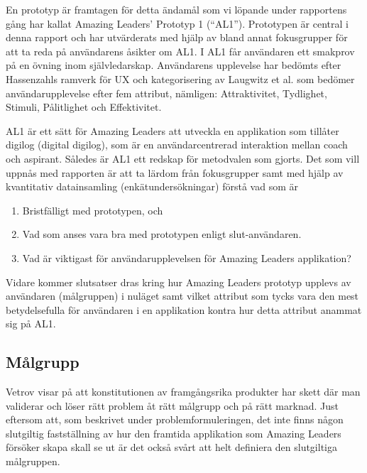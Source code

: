 En prototyp är framtagen för detta ändamål som vi löpande under rapportens gång har kallat Amazing Leaders' Prototyp 1 (\enquote{AL1}). Prototypen är central i denna rapport och har utvärderats med hjälp av bland annat fokusgrupper för att ta reda på användarens åsikter om  AL1. I AL1 får användaren ett smakprov på en övning inom självledarskap. Användarens upplevelse har bedömts efter Hassenzahls ramverk för UX \cite{Hassenzahl2001TheAppealingness} och kategorisering av Laugwitz et al. \cite{Laugwitz2008ConstructionQuestionnaire} som bedömer användarupplevelse efter fem attribut, nämligen: Attraktivitet, Tydlighet, Stimuli, Pålitlighet och Effektivitet. 
\newline


AL1 är ett sätt för Amazing Leaders att utveckla en applikation som tillåter digilog (digital digilog), som är en användarcentrerad interaktion mellan coach och aspirant. Således är AL1 ett redskap för metodvalen som gjorts. Det som vill uppnås med rapporten är att ta lärdom från fokusgrupper samt med hjälp av kvantitativ datainsamling (enkätundersökningar) förstå vad som är 

\begin{enumerate}
\item Bristfälligt med prototypen, och
\item Vad som anses vara bra med prototypen enligt slut-användaren.
\item Vad är viktigast för användarupplevelsen för Amazing Leaders applikation?
\end{enumerate}
Vidare kommer slutsatser dras kring hur Amazing Leaders prototyp upplevs av användaren (målgruppen) i nuläget samt vilket attribut som tycks vara den mest betydelsefulla för användaren i en applikation kontra hur detta attribut anammat sig på AL1.  


\subsection{Målgrupp}
\label{sec:problem-definition}
Vetrov visar på att konstitutionen av framgångsrika produkter har skett där man validerar och löser rätt problem åt rätt målgrupp och på rätt marknad. \cite{Vetrov2013AppliedUXmatters} 
Just eftersom att, som beskrivet under problemformuleringen, det inte finns någon slutgiltig fastställning av hur den framtida applikation som Amazing Leaders försöker skapa skall se ut är det också svårt att helt definiera den slutgiltiga målgruppen. 
\newline

